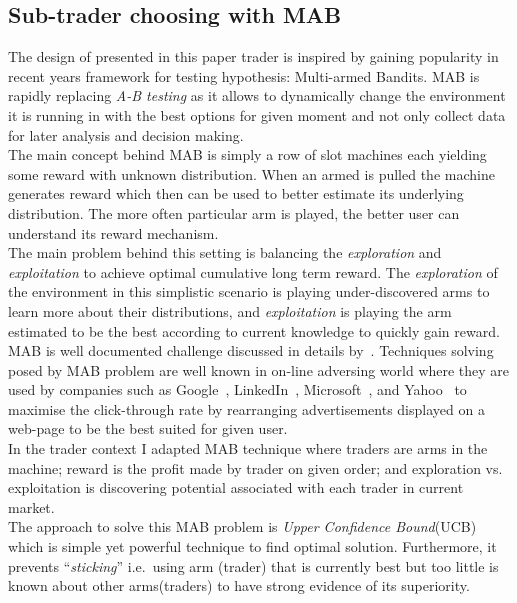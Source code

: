 \documentclass{llncs}
\begin{document}
\subsection{Sub-trader choosing with MAB}
The design of presented in this paper trader is inspired by gaining popularity in recent years framework for testing hypothesis: Multi-armed Bandits. MAB is rapidly replacing \emph{A-B testing} as it allows to dynamically change the environment it is running in with the best options for given moment and not only collect data for later analysis and decision making.\\
The main concept behind MAB is simply a row of slot machines each yielding some reward with unknown distribution. When an armed is pulled the machine generates reward which then can be used to better estimate its underlying distribution. The more often particular arm is played, the better user can understand its reward mechanism.\\
The main problem behind this setting is balancing the \emph{exploration} and \emph{exploitation} to achieve optimal cumulative long term reward. The \emph{exploration} of the environment in this simplistic scenario is playing under-discovered arms to learn more about their distributions, and \emph{exploitation} is playing the arm estimated to be the best according to current knowledge to quickly gain reward.\\
MAB is well documented challenge discussed in details by~\cite{berry+firstedt,gittins+glazebrook+weber}. Techniques solving posed by MAB problem are well known in on-line adversing world where they are used by companies such as Google~\cite{AYPSze12,ASMB:ASMB874}, LinkedIn~\cite{Tang:2013:AAF:2505515.2514700}, Microsoft~\cite{graepel2010web}, and Yahoo~\cite{Li:2010:CAP:1772690.1772758} to maximise the click-through rate by rearranging advertisements displayed on a web-page to be the best suited for given user.\\

In the trader context I adapted MAB technique where traders are arms in the machine; reward is the profit made by trader on given order; and exploration vs. exploitation is discovering potential associated with each trader in current market.\\
The approach to solve this MAB problem is \emph{Upper Confidence Bound}(UCB)~\cite{white2012bandit} which is simple yet powerful technique to find optimal solution. Furthermore, it prevents ``\emph{sticking}'' i.e.\ using arm (trader) that is currently best but too little is known about other arms(traders) to  have strong evidence of its superiority.\\
\end{document}
